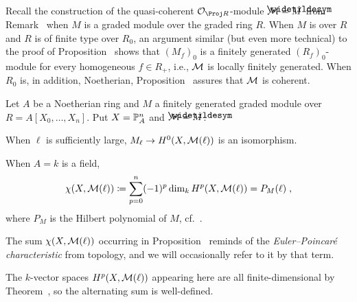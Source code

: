 \documentclass[a4paper,parskip=half,numbers=enddot, DIV=12]{scrreprt}
\begin{document}
Recall the construction of the quasi-coherent $\Oo_{\Proj R}$-module $\Mm=\snake{M}$ from Remark~ when $M$ is a graded module over the graded ring $R$. When $M$ is over $R$ and $R$ is of finite type over $R_0$, an argument similar (but even more technical) to the proof of Proposition~ shows that $(M_f)_0$ is a finitely generated $(R_f)_0$-module for every homogeneous $f\in R_+$, i.e., $\mathcal{M}$ is locally finitely generated. When $R_0$ is, in addition, Noetherian, Proposition~ assures that $\mathcal{M}$ is coherent.
\begin{prop}[Serre]
	Let $A$ be a Noetherian ring and $M$ a finitely generated graded module over $R=A[X_0,\ldots,X_n]$. Put $X=\mathbb{P}_A^n$ and $\Mm=\snake{M}$.
	\begin{alphanumerate}
		\item When $\ell$ is sufficiently large, $M_\ell\morphism H^0(X,\Mm(\ell))$ is an isomorphism.
		\item When $A=k$ is a field,
		\begin{align*}
			\chi(X,\mathcal{M}(\ell))\coloneqq\sum_{p=0}^{n}(-1)^p\dim_kH^p(X,\mathcal{M}(\ell))=P_M(\ell)\;,
		\end{align*}
		where $P_M$ is the Hilbert polynomial of $M$, cf.\ \cite[Definition~3.1.3]{alg2}.
	\end{alphanumerate}
\end{prop}
\begin{rem*}
	\begin{alphanumerate}
		\item The sum $\chi(X,\mathcal{M}(\ell))$ occurring in Proposition~ reminds of the \emph{Euler--Poincaré characteristic} from topology, and we will occasionally refer to it by that term.
		\item The $k$-vector spaces $H^p(X,\mathcal{M}(\ell))$ appearing here are all finite-dimensional by Theorem~, so the alternating sum is well-defined.
	\end{alphanumerate}
\end{rem*}
\end{document}
